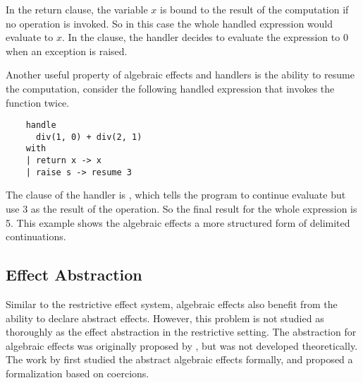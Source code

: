 In the return clause, the variable $x$ is bound to the result of the computation if no operation is invoked. So in this case the whole handled expression would evaluate to $x$. In the  clause, the handler decides to evaluate the expression to 0 when an exception is raised. 

Another useful property of algebraic effects and handlers is the ability to resume the computation, consider the following handled expression that invokes the function  twice.

\begin{verbatim}
	handle 
	  div(1, 0) + div(2, 1)
	with 
	| return x -> x
	| raise s -> resume 3
\end{verbatim}

The  clause of the handler is  , which tells the program to continue evaluate but use 3 as the result of the operation. So the final result for the whole expression is 5. This example shows the algebraic effects a more structured form of delimited continuations. 

\subsection{Effect Abstraction}
Similar to the restrictive effect system, algebraic effects also benefit from the ability to declare abstract effects. However, this problem is not studied as thoroughly as the effect abstraction in the restrictive setting. The abstraction for algebraic effects was originally proposed by \citet{leijen18}, but was not developed theoretically. The work by \citet{biernacki19} first studied the abstract algebraic effects formally, and proposed a formalization based on coercions.





